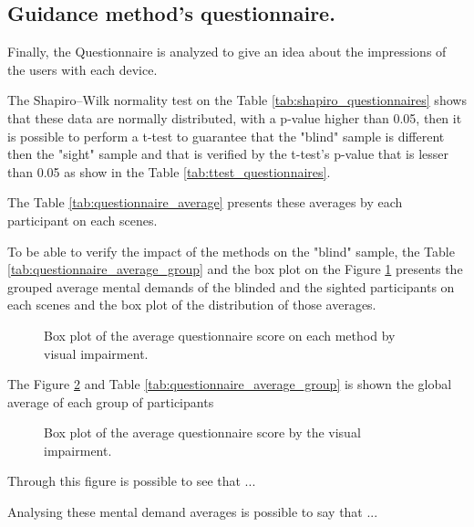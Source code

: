 \subsection{Guidance method's questionnaire.}
\label{subsec:results_questionnaires}

Finally, the Questionnaire is analyzed to give an idea about the impressions of the users with each device.

The Shapiro–Wilk normality test on the Table \ref{tab:shapiro_questionnaires} shows that these data are normally distributed, with a p-value higher than 0.05, then it is possible to perform a t-test to guarantee that the "blind" sample is different then the "sight" sample and that is verified by the t-test's p-value that is lesser than 0.05 as show in the Table \ref{tab:ttest_questionnaires}.





The Table \ref{tab:questionnaire_average} presents these averages by each participant on each scenes.



To be able to verify the impact of the methods on the "blind" sample, the Table \ref{tab:questionnaire_average_group} and the box plot on the Figure \ref{fig:boxplot_questionnaire_scene} presents the grouped average mental demands of the blinded and the sighted participants on each scenes and the box plot of the distribution of those averages.



\begin{figure}[!htb]
    \centering
    \resizebox{0.8\linewidth}{!}{
    
    }
    \caption{Box plot of the average questionnaire score on each method by visual impairment.}
    \label{fig:boxplot_questionnaire_scene}
\end{figure}

The Figure \ref{fig:boxplot_questionnaire} and Table \ref{tab:questionnaire_average_group} is shown the global average of each group of participants

\begin{figure}[!htb]
    \centering
    \resizebox{0.8\linewidth}{!}{
        
    }
    \caption{Box plot of the average questionnaire score by the visual impairment.}
    \label{fig:boxplot_questionnaire}
\end{figure}

Through this figure is possible to see that ... 

Analysing these mental demand averages is possible to say that ...

\FloatBarrier
